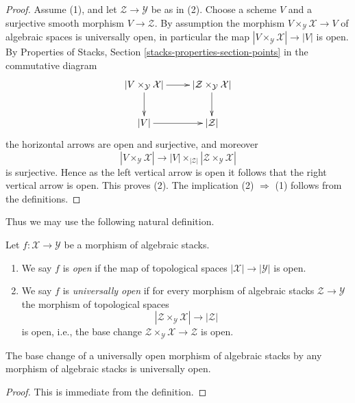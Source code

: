 \begin{proof}
Assume (1), and let $\mathcal{Z} \to \mathcal{Y}$ be as in (2).
Choose a scheme $V$ and a surjective smooth morphism $V \to \mathcal{Z}$.
By assumption the morphism $V \times_\mathcal{Y} \mathcal{X} \to V$
of algebraic spaces is universally open, in particular the map
$|V \times_\mathcal{Y} \mathcal{X}| \to |V|$ is open. By
Properties of Stacks, Section \ref{stacks-properties-section-points}
in the commutative diagram
$$
\xymatrix{
|V \times_\mathcal{Y} \mathcal{X}| \ar[r] \ar[d] &
|\mathcal{Z} \times_\mathcal{Y} \mathcal{X}| \ar[d] \\
|V| \ar[r] & |\mathcal{Z}|
}
$$
the horizontal arrows are open and surjective, and moreover
$$
|V \times_\mathcal{Y} \mathcal{X}| \longrightarrow
|V| \times_{|\mathcal{Z}|} |\mathcal{Z} \times_\mathcal{Y} \mathcal{X}|
$$
is surjective. Hence as the left vertical arrow is open it follows that
the right vertical arrow is open. This proves (2).
The implication (2) $\Rightarrow$ (1) follows from the definitions.
\end{proof}

\noindent
Thus we may use the following natural definition.

\begin{definition}
\label{definition-open}
Let $f : \mathcal{X} \to \mathcal{Y}$ be a morphism of algebraic stacks.
\begin{enumerate}
\item We say $f$ is {\it open} if the map of topological
spaces $|\mathcal{X}| \to |\mathcal{Y}|$ is open.
\item We say $f$ is {\it universally open} if for every morphism
of algebraic stacks $\mathcal{Z} \to \mathcal{Y}$
the morphism of topological spaces
$$
|\mathcal{Z} \times_\mathcal{Y} \mathcal{X}| \to |\mathcal{Z}|
$$
is open, i.e., the base change
$\mathcal{Z} \times_\mathcal{Y} \mathcal{X} \to \mathcal{Z}$ is open.
\end{enumerate}
\end{definition}

\begin{lemma}
\label{lemma-base-change-universally-open}
The base change of a universally open morphism of algebraic stacks
by any morphism of algebraic stacks is universally open.
\end{lemma}

\begin{proof}
This is immediate from the definition.
\end{proof}

